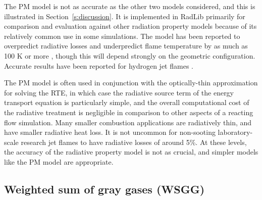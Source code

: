 \documentclass[preprint,12pt]{elsarticle}
\begin{document}
The PM model is not as accurate as the other two models considered, and this is illustrated in Section~\ref{s:discussion}.
It is implemented in RadLib primarily for comparison and evaluation against other radiation property models because of its relatively common use in some simulations.
The model has been reported to overpredict radiative losses and underpredict flame temperature by as much as 100 K or more \cite{Frank_2000,Zhu_2002,Coelho_2002}, though this will depend strongly on the geometric configuration. Accurate results have been reported for hydrogen jet flames \cite{Barlow_1999}.

The PM model is often used in conjunction with the optically-thin approximation for solving the RTE, in which case the radiative source term of the energy transport equation is particularly simple, and the overall computational cost of the radiative treatment is negligible in comparison to other aspects of a reacting flow simulation. Many smaller combustion applications are radiatively thin, and have smaller radiative heat loss. It is not uncommon for non-sooting laboratory-scale research jet flames to have radiative losses of around 5\%. At these levels, the accuracy of the radiative property model is not as crucial, and simpler models like the PM model are appropriate.


\subsection{Weighted sum of gray gases (WSGG)} \label{s:wsgg}
\end{document}
